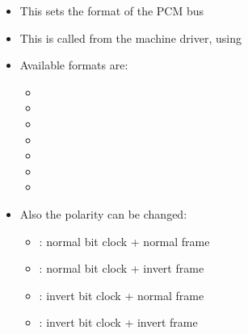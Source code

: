 \begin{frame}{}
  \begin{itemize}
  \item This sets the format of the PCM bus
  \item This is called from the machine driver, using
  \item Available formats are:
    \begin{itemize}
    \item {}
    \item {}
    \item {}
    \item {}
    \item {}
    \item {}
    \item {}
    \end{itemize}
  \item Also the polarity can be changed:
    \begin{itemize}
    \item {}: normal bit clock + normal frame
    \item {}: normal bit clock + invert frame
    \item {}: invert bit clock + normal frame
    \item {}: invert bit clock + invert frame
    \end{itemize}
  \end{itemize}
\end{frame}

